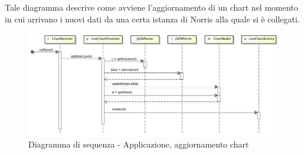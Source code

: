             
            Tale diagramma descrive come avviene l'aggiornamento di un chart nel momento in cui arrivano i nuovi dati da una certa istanza di Norris alla quale si è collegati.
            \begin{figure}[H]
                \centering
                \includegraphics[scale=0.3]{DefinizioneDiProdotto/Pics/ApplicazioneAggiornamentoChart}
                \caption{Diagramma di sequenza - Applicazione, aggiornamento chart}
            \end{figure}

